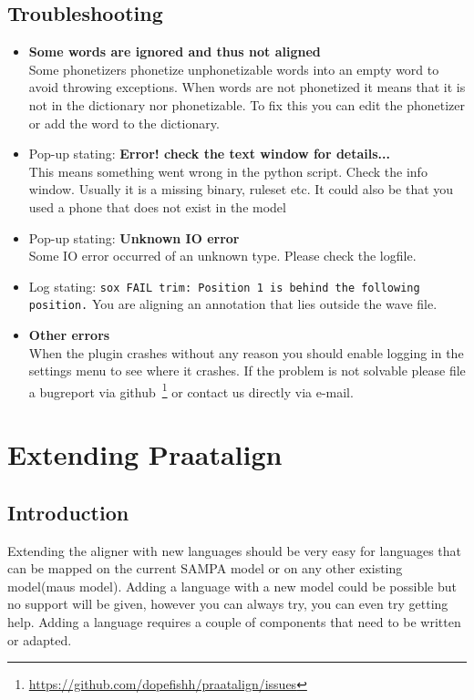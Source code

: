 \section{Troubleshooting}
\begin{itemize}
	\item \textbf{Some words are ignored and thus not aligned}\\
		Some phonetizers phonetize unphonetizable words into an empty word to avoid
		throwing exceptions. When words are not phonetized it means that it is not
		in the dictionary nor phonetizable. To fix this you can edit the phonetizer
		or add the word to the dictionary.
	\item Pop-up stating: \textbf{Error! check the text window for details...}\\
		This means something went wrong in the python script. Check the info
		window. Usually it is a missing binary, ruleset etc. It could also be
		that you used a phone that does not exist in the model
	\item Pop-up stating: \textbf{Unknown IO error}\\
		Some IO error occurred of an unknown type. Please check the logfile.
	\item Log stating: \texttt{sox FAIL trim: Position 1 is behind the
		following position.}
		You are aligning an annotation that lies outside the wave file.
	\item \textbf{Other errors}\\
		When the plugin crashes without any reason you should enable logging in the
		settings menu to see where it crashes. If the problem is not solvable
		please file a bugreport via
		github~\footnote{\url{https://github.com/dopefishh/praatalign/issues}} or
		contact us directly via e-mail.
\end{itemize}

\chapter{Extending Praatalign}
\section{Introduction}
Extending the aligner with new languages should be very easy for languages that
can be mapped on the current SAMPA model or on any other existing model(maus
model).
Adding a language with a new model could be possible but no support will be
given, however you can always try, you can even try getting help. Adding a
language requires a couple of components that need to be written or adapted.

